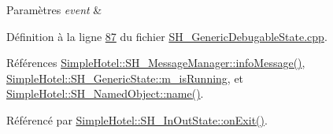 \begin{DoxyParams}{Paramètres}
{\em event} & \\
\hline
\end{DoxyParams}


Définition à la ligne \hyperlink{SH__GenericDebugableState_8cpp_source_l00087}{87} du fichier \hyperlink{SH__GenericDebugableState_8cpp_source}{S\-H\-\_\-\-Generic\-Debugable\-State.\-cpp}.



Références \hyperlink{classSimpleHotel_1_1SH__MessageManager_a76697bfabd6917a3b20ed58c22a34ed7}{Simple\-Hotel\-::\-S\-H\-\_\-\-Message\-Manager\-::info\-Message()}, \hyperlink{classSimpleHotel_1_1SH__GenericState_a4e4ba53c9e163eed2685cfda8745308d}{Simple\-Hotel\-::\-S\-H\-\_\-\-Generic\-State\-::m\-\_\-is\-Running}, et \hyperlink{classSimpleHotel_1_1SH__NamedObject_ad144716345034c91cface8f3163a799e}{Simple\-Hotel\-::\-S\-H\-\_\-\-Named\-Object\-::name()}.



Référencé par \hyperlink{classSimpleHotel_1_1SH__InOutState_aa5fc1b9281087bd8abcd6873d2a36009}{Simple\-Hotel\-::\-S\-H\-\_\-\-In\-Out\-State\-::on\-Exit()}.



